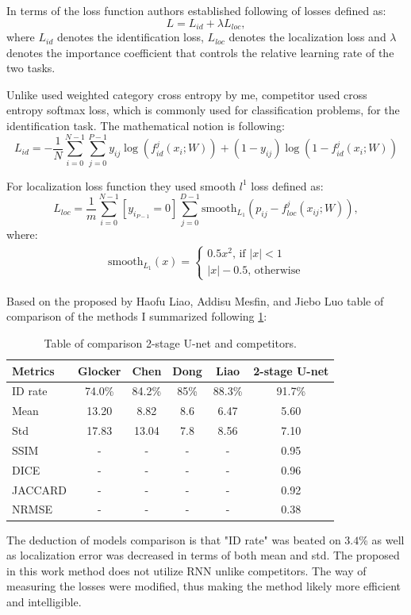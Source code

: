 In terms of the loss function authors established following of losses defined as:
\[L = L_{id} + \lambda L_{loc}, \]
where $L_{id}$ denotes the identification loss, $L_{loc}$ denotes the localization loss and $\lambda$ denotes the importance coefficient that controls the relative learning rate of the two tasks. 

Unlike used weighted category cross entropy by me, competitor used cross entropy softmax loss, which is commonly used for classification problems, for the identification task. The mathematical notion is following:
\[L_{id}  = - \frac{1}{N} \sum_{i=0}^{N-1}\sum_{j=0}^{P-1} y_{ij} \log (f_{id}^j(x_i; W)) + (1-y_{ij}) \log (1-f_{id}^j(x_i;W)) \]

For localization loss function they used smooth $l^{1}$ loss defined as:
\[ L_{loc} = \frac{1}{m} \sum_{i=0}^{N-1} [y_i_{P-1} = 0] \sum_{j=0}^{D-1} \text{smooth}_L_1 (p_{ij} - f_{loc}^j(x_{ij}; W)), \]
where:
\begin{align*}
\text{smooth}_{L_1}(x) =
\begin{cases}
0.5x^2 \mbox{, if } \lvert x \rvert < 1  \\ 
\lvert x \rvert - 0.5 \mbox{, otherwise} \end{cases}
\end{align*}

Based on the proposed by Haofu Liao, Addisu Mesfin, and Jiebo Luo table of comparison \cite{Liao2018} of the methods I summarized following \ref{tab:2-stage_u-net_vs_rest}:

\begin{table}[h]
\centering
\begin{tabular}{|l|c|c|c|c|c|}
\hline
Metrics & Glocker & Chen & Dong & Liao & 2-stage U-net \\
\hline
\hline
ID rate & 74.0\% & 84.2\% & 85\% & 88.3\% & 91.7\% \\
\hline
Mean & 13.20 & 8.82 & 8.6 & 6.47 & 5.60 \\
\hline
Std & 17.83 & 13.04 & 7.8 & 8.56 & 7.10 \\
\hline
SSIM & - & - & - & - & 0.95 \\ 
\hline
DICE & - & - & - & - & 0.96\\ 
\hline
JACCARD & - & - & - & - & 0.92\\ 
\hline
NRMSE & - & - & - & - & 0.38 \\
\hline
\end{tabular}
\caption{Table of comparison 2-stage U-net and competitors.}
\label{tab:2-stage_u-net_vs_rest}
\end{table}

The deduction of models comparison is that "ID rate" was beated on $3.4$\% as well as localization error was decreased in terms of both mean and std. The proposed in this work method does not utilize RNN unlike competitors. The way of measuring the losses were modified, thus making the method likely more efficient and intelligible. 
